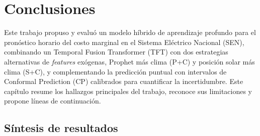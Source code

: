 \chapter{Conclusiones}

Este trabajo propuso y evaluó un modelo híbrido de aprendizaje profundo para el pronóstico horario del costo marginal en el Sistema Eléctrico Nacional (SEN), combinando un Temporal Fusion Transformer (TFT) con dos estrategias alternativas de \textit{features} exógenas, Prophet más clima (P+C) y posición solar más clima (S+C), y complementando la predicción puntual con intervalos de Conformal Prediction (CP) calibrados para cuantificar la incertidumbre. Este capítulo resume los hallazgos principales del trabajo, reconoce sus limitaciones y propone líneas de continuación.

\section{Síntesis de resultados}

